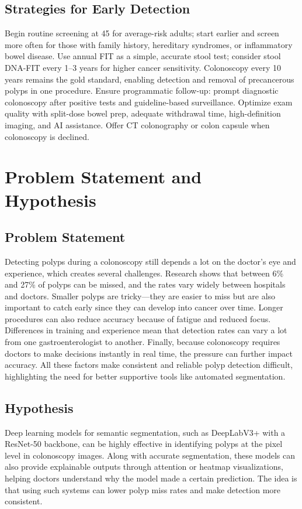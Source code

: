 \documentclass[a4paper,12pt]{report}
\begin{document}
    \subsection{Strategies for Early Detection}
Begin routine screening at 45 for average-risk adults; start earlier and screen more often for those with family history, hereditary syndromes, or inflammatory bowel disease. Use annual FIT as a simple, accurate stool test; consider stool DNA-FIT every 1–3 years for higher cancer sensitivity. Colonoscopy every 10 years remains the gold standard, enabling detection and removal of precancerous polyps in one procedure. Ensure programmatic follow-up: prompt diagnostic colonoscopy after positive tests and guideline-based surveillance. Optimize exam quality with split-dose bowel prep, adequate withdrawal time, high-definition imaging, and AI assistance. Offer CT colonography or colon capsule when colonoscopy is declined.



\section{Problem Statement and Hypothesis}
\subsection{Problem Statement}
Detecting polyps during a colonoscopy still depends a lot on the doctor’s eye and experience, which creates several challenges. Research shows that between 6\% and 27\% of polyps can be missed, and the rates vary widely between hospitals and doctors. Smaller polyps are tricky—they are easier to miss but are also important to catch early since they can develop into cancer over time. Longer procedures can also reduce accuracy because of fatigue and reduced focus. Differences in training and experience mean that detection rates can vary a lot from one gastroenterologist to another. Finally, because colonoscopy requires doctors to make decisions instantly in real time, the pressure can further impact accuracy. All these factors make consistent and reliable polyp detection difficult, highlighting the need for better supportive tools like automated segmentation.

\subsection{Hypothesis}
Deep learning models for semantic segmentation, such as DeepLabV3+ with a ResNet-50 backbone, can be highly effective in identifying polyps at the pixel level in colonoscopy images. Along with accurate segmentation, these models can also provide explainable outputs through attention or heatmap visualizations, helping doctors understand why the model made a certain prediction. The idea is that using such systems can lower polyp miss rates and make detection more consistent.
\end{document}
